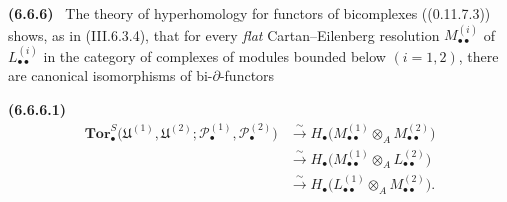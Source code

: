 \documentclass[10pt,oneside]{book}
\newcommand{\sh}[1]{\mathscr{#1}}
\newcommand{\sref}[2][]{(#2)}
\newenvironment{env}[1][]{\par\medskip\noindent\textbf{(#1)}\ }{\par}
\begin{document}
\begin{env}[6.6.6]
\label{III.6.6.6}
The theory of hyperhomology for functors of bicomplexes
(\sref[0]{0.11.7.3}) shows, as in \sref{III.6.3.4}, that for
every \emph{flat} Cartan--Eilenberg resolution
$M_{\bullet\bullet}^{(i)}$ of $L_{\bullet\bullet}^{(i)}$ in the
category of complexes of modules bounded below $(i=1,2)$, there
are canonical isomorphisms of bi-$\partial$-functors
\begin{env}[6.6.6.1]
\label{III.6.6.6.1}
\[
\begin{split}
  \mathbf{Tor}_\bullet^S
  \bigl(
    \mathfrak U^{(1)},\mathfrak U^{(2)};
    \sh P_\bullet^{(1)},\sh P_\bullet^{(2)}
  \bigr)
  &\xrightarrow{\sim}
  H_\bullet
  \bigl(
    M_{\bullet\bullet}^{(1)}
    \otimes_A M_{\bullet\bullet}^{(2)}
  \bigr)\\
  &\xrightarrow{\sim}
  H_\bullet
  \bigl(
    M_{\bullet\bullet}^{(1)}
    \otimes_A L_{\bullet\bullet}^{(2)}
  \bigr)\\
  &\xrightarrow{\sim}
  H_\bullet
  \bigl(
    L_{\bullet\bullet}^{(1)}
    \otimes_A M_{\bullet\bullet}^{(2)}
  \bigr).
\end{split}
\tag{6.6.6.1}
\]
\end{env}
\end{env}
\end{document}
